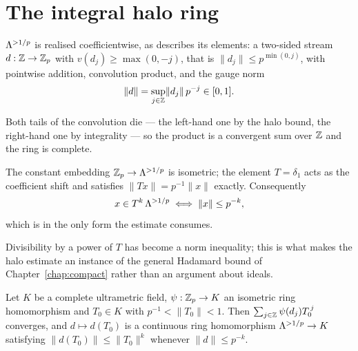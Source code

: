 \section{The integral halo ring}

\begin{definition}
  \label{def:haloint}
  \leanok
  $\Lambda^{>1/p}$ is realised coefficientwise, as \cite[proof of Corollary 3.18]{LWX} describes its
  elements: a two-sided stream $d : \mathbb{Z} \to \mathbb{Z}_p$ with $v(d_j) \geq \max(0, -j)$, that is
  $\lVert d_j\rVert \leq p^{\min(0,j)}$, with pointwise addition, convolution product, and the
  gauge norm
  \[
    \lVert d\rVert = \sup_{j\in\mathbb{Z}} \lVert d_j \rVert\, p^{-j} \in [0,1] .
  \]
\end{definition}

Both tails of the convolution die --- the left-hand one by the halo bound, the right-hand one by
integrality --- so the product is a convergent sum over $\mathbb{Z}$ and the ring is complete.

\begin{proposition}
  \label{prop:haloint-norm}
  \leanok
  The constant embedding $\mathbb{Z}_p \to \Lambda^{>1/p}$ is isometric; the element $T = \delta_1$ acts as the
  coefficient shift and satisfies $\lVert Tx\rVert = p^{-1}\lVert x\rVert$ exactly.
  Consequently
  \[
    x \in T^{k}\,\Lambda^{>1/p} \iff \lVert x\rVert \leq p^{-k},
  \]
  which is \cite[Lemma 3.15]{LWX} in the only form the estimate consumes.
\end{proposition}

Divisibility by a power of $T$ has become a norm inequality; this is what makes the halo estimate
an instance of the general Hadamard bound of Chapter~\ref{chap:compact} rather than an argument
about ideals.

\begin{definition}
  \label{def:halo-specialize}
  \leanok
  Let $K$ be a complete ultrametric field, $\psi : \mathbb{Z}_p \to K$ an isometric ring homomorphism and
  $T_0 \in K$ with $p^{-1} < \lVert T_0\rVert < 1$.  Then $\sum_{j\in\mathbb{Z}}\psi(d_j)T_0^{\,j}$
  converges, and $d \mapsto d(T_0)$ is a continuous ring homomorphism $\Lambda^{>1/p} \to K$
  satisfying $\lVert d(T_0)\rVert \leq \lVert T_0\rVert^{k}$ whenever $\lVert d\rVert\leq p^{-k}$.
\end{definition}


